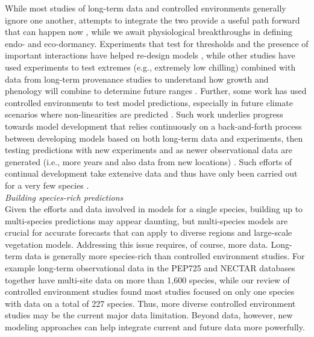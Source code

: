 \documentclass[11pt,letter]{article}
\begin{document}
While most studies of long-term data and controlled environments generally ignore one another, attempts to integrate the two provide a useful path forward that can happen now \citep{Caffarra:2011qf,nagano2012,satake2013,ford2016,chuinearees}, while we await physiological breakthroughs in defining endo- and eco-dormancy. Experiments that test for thresholds and the presence of important interactions have helped re-design models \citep{Caffarra:2011qf,chuinearees}, while other studies have used experiments to test extremes (e.g., extremely low chilling) combined with data from long-term provenance studies to understand how growth and phenology will combine to determine future ranges \citep{ford2016}. Further, some work has used controlled environments to test model predictions, especially in future climate scenarios where non-linearities are predicted \citep[see][]{nagano2012}. Such work underlies progress towards model development that relies continuously on a back-and-forth process between developing models based on both long-term data and experiments, then testing predictions with new experiments and as newer observational data are generated (i.e., more years and also data from new locations) \citep{nagano2012,satake2013}. Such efforts of continual development take extensive data and thus have only been carried out for a very few species \citep[e.g., \emph{Arabidopsis thaliana}, \emph{Oryza sativa} (rice), \emph{Arabidopsis halleri}][]{Wilczek:2009oa,nagano2012,satake2013}.\\

\emph{Building species-rich predictions}\\
Given the efforts and data involved in models for a single species, building up to multi-species predictions may appear daunting, but multi-species models are crucial for accurate forecasts that can apply to diverse regions and large-scale vegetation models. Addressing this issue requires, of course, more data. Long-term data is generally more species-rich than controlled environment studies. For example long-term observational data in the PEP725 and NECTAR databases together have multi-site data on more than 1,600 species, while our review of controlled environment studies found most studies focused on only one species with data on a total of 227 species. Thus, more diverse controlled environment studies may be the current major data limitation. Beyond data, however, new modeling approaches can help integrate current and future data more powerfully. \\
\end{document}
